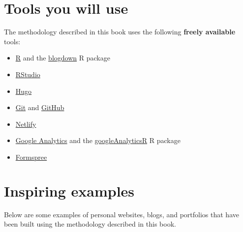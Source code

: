 \documentclass[
]{book}
\providecommand{\tightlist}{%
  \setlength{\itemsep}{0pt}\setlength{\parskip}{0pt}}
\begin{document}
\hypertarget{tools}{%
\section{Tools you will use}\label{tools}}

The methodology described in this book uses the following \textbf{freely available} tools:

\begin{itemize}
\tightlist
\item
  \href{https://cran.rstudio.com/}{R} and the \href{https://bookdown.org/yihui/blogdown/}{blogdown} R package
\item
  \href{https://www.rstudio.com/products/rstudio/\#rstudio-desktop}{RStudio}
\item
  \href{https://gohugo.io/}{Hugo}
\item
  \href{https://git-scm.com/}{Git} and \href{https://github.com/}{GitHub}
\item
  \href{https://app.netlify.com/}{Netlify}
\item
  \href{https://analytics.google.com/}{Google Analytics} and the \href{https://code.markedmondson.me/googleAnalyticsR/}{googleAnalyticsR} R package
\item
  \href{https://formspree.io}{Formspree}
\end{itemize}

\hypertarget{inspiring-examples}{%
\section{Inspiring examples}\label{inspiring-examples}}

Below are some examples of personal websites, blogs, and portfolios that have been built using the methodology described in this book.
\end{document}
